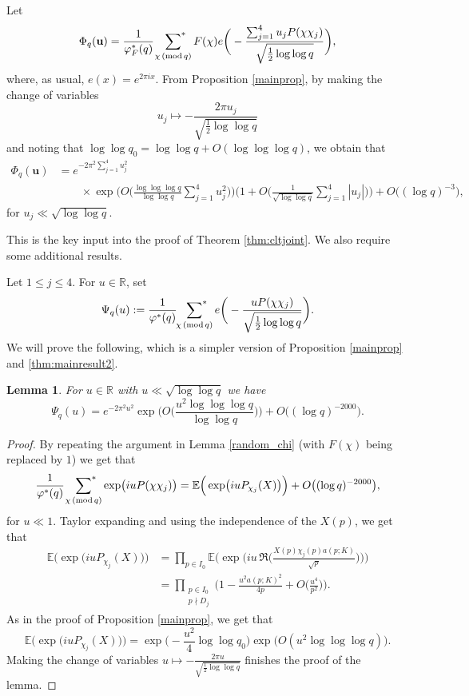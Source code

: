 \documentclass[12pt, reqno]{amsart}
\renewcommand{\pmod}[1]{\,(\mathrm{mod}\,#1)}
\newtheorem{lemma}[theorem]{Lemma}
\numberwithin{equation}{section}
\numberwithin{theorem}{section}
\numberwithin{equation}{section}
\def\sumstar{\sideset{}{^*}\sum}
\begin{document}
Let
\[
\Phi_q(\textbf{u})=\frac{1}{\varphi_F^{*}(q)}\ \sumstar_{\chi \pmod q} F(\chi)  
e\bigg( - \frac{\sum_{j=1}^4 u_jP(\chi\chi_j)}{\sqrt{\frac12 \log \log q}}\bigg),
\]
where, as usual,  $e(x)=e^{2\pi i x}$.
From Proposition \ref{mainprop}, by making the change of variables 
$$ u_j \mapsto - \frac{2 \pi u_j}{ \sqrt{ \frac{1}{2} \log \log q}}$$ and noting that $\log\log q_0=\log\log q+O(\log\log\log q)$, we obtain that
\begin{align}\label{thm:mainresult2}
\Phi_q(\textbf{u})& = e^{-2 \pi^2 \sum_{j=1}^4u_j^2}   \\
&\qquad \times   \exp \bigg( O \Big( \frac{ \log \log \log q }{\log \log q} \sum_{j=1}^4 u_j^2\Big) \bigg) \bigg(1 +O \Big(  \frac{1}{\sqrt{\log \log q}}\sum_{j=1}^4  |u_j|\Big) \bigg) + O \Big(  (\log q)^{-3}\Big),\nonumber
\end{align}
for $u_j\ll\sqrt{\log\log q}$. 

This is the key input into the proof of Theorem \ref{thm:cltjoint}. We also require some additional results.

Let $1\leq j\leq 4$. For $u \in \mathbb{R}$, set
\[
\Psi_q(u):=\frac{1}{\varphi^*(q)} \, \sumstar_{\chi \pmod  q}
e \bigg(-\frac{uP(\chi\chi_j)}{\sqrt{\frac12\log\log q}}\bigg). 
\]
We will prove the following, which is a simpler version of Proposition \ref{mainprop} and \eqref{thm:mainresult2}.

\begin{lemma}\label{lem:cf}
For $u\in\mathbb R$ with $u\ll \sqrt{\log\log q}$ we have
\[
\Psi_q(u)=e^{-2\pi^2u^2}\exp \bigg( O \Big( \frac{ u^2\log \log \log q }{\log \log q} \Big) \bigg)
+O\bigl((\log q)^{-2000}\bigr).
\]
\end{lemma}

\begin{proof}
By repeating the argument in Lemma \ref{random_chi} (with $F(\chi)$ being replaced by $1$) we get that 
\[
\frac1{\varphi^*(q)}\ \sumstar_{\chi \pmod q}\exp \bigl(iu P(\chi\chi_j)\bigr)
=\mathbb E \Big(\exp \bigl(iu P_{\chi_j}(X)\bigr)\Big)+O\bigl((\log q)^{-2000}\bigr),
\]
for $u\ll 1$.
Taylor expanding and using the
independence of the $X(p)$, we get that 
\begin{align*}
\mathbb E \Big(\exp \bigl(iu P_{\chi_j}(X)\bigr) \Big)
&=\prod_{p\in I_0}\mathbb E \Bigg(\exp \bigg(iu\,\Re\Big(\frac{X(p)\chi_j(p)a(p;K)}{\sqrt p}\Big)\bigg)\Bigg)\\
&=\prod_{\substack{p\in I_0 \\ p \nmid D_j}}\bigg(1-\frac{u^2a(p;K)^2}{4p}+O\Big(\frac{u^4}{p^2}\Big)\bigg).
\end{align*}
As in the proof of Proposition \ref{mainprop}, we get that 
\[
\mathbb E \Big(\exp \bigl(iu P_{\chi_j}(X)\bigr)\Big)=\exp\Big(-\frac{u^2}{4}\log\log q_0\Big)\exp \Big( O ( u^2  \log \log \log q )\Big).
\]
Making the change of variables
$u\mapsto -\frac{2\pi u}{\sqrt{\frac12\log\log q}}$ finishes the proof of the lemma.
\end{proof}
\end{document}
